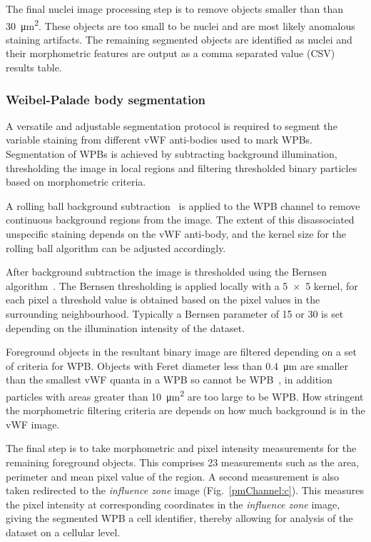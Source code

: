 The final nuclei image processing step is to remove objects smaller than than \SI{30}{\micro\meter\squared}. These objects are too small to be nuclei and are most likely anomalous staining artifacts. The remaining segmented objects are identified as nuclei and their morphometric features are output as a comma separated value (CSV) results table. 

\subsubsection{Weibel-Palade body segmentation}
\label{singleCellAnalysis:wpb}
A versatile and adjustable segmentation protocol is required to segment the variable staining from different vWF anti-bodies used to mark WPBs. Segmentation of WPBs is achieved by subtracting background illumination, thresholding the image in local regions and filtering thresholded binary particles based on morphometric criteria. 

A rolling ball background subtraction~\cite{Sternberg1983} is applied to the WPB channel to remove continuous background regions from the image. The extent of this disassociated unspecific staining depends on the vWF anti-body, and the kernel size for the rolling ball algorithm can be adjusted accordingly. 

After background subtraction the image is thresholded using the Bernsen algorithm~\cite{Bernsen1986}. The Bernsen thresholding is applied locally with a 5~$\times$~5 kernel, for each pixel a threshold value is obtained based on the pixel values in the surrounding neighbourhood. Typically a Bernsen parameter of 15 or 30 is set depending on the illumination intensity of the dataset. 

Foreground objects in the resultant binary image are filtered depending on a set of criteria for WPB. Objects with Feret diameter less than \SI{0.4}{\micro\meter} are smaller than the smallest vWF quanta in a WPB so cannot be WPB~\cite{Ferraro2014}, in addition particles with areas greater than \SI{10}{\micro\meter\squared} are too large to be WPB. How stringent the morphometric filtering criteria are depends on how much background is in the vWF image. 

The final step is to take morphometric and pixel intensity measurements for the remaining foreground objects. This comprises 23 measurements such as the area, perimeter and mean pixel value of the region. A second measurement is also taken redirected to the \emph{influence zone} image (Fig.~\ref{pmChannel:c}). This measures the pixel intensity at corresponding coordinates in the \emph{influence zone} image, giving the segmented WPB a cell identifier, thereby allowing for analysis of the dataset on a cellular level.

